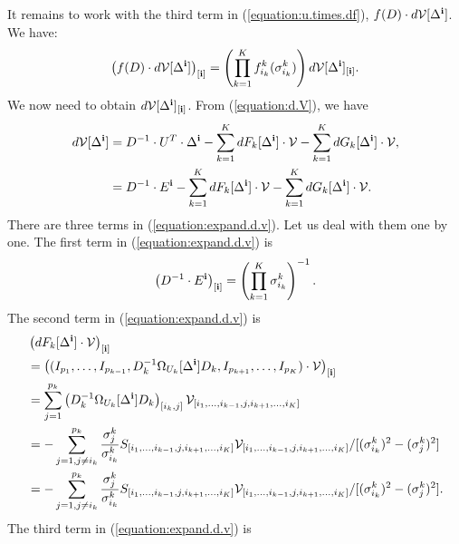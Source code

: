 It remains to work with the third term in (\ref{equation:u.times.df}),
$f(D) \cdot d\mathcal{V}[\Delta^{\bf i}]$.  We have:
\begin{align}
  \left(f(D) \cdot d\mathcal{V}[\Delta^{\bf i}]\right)_{[\mathbf{i}]} = \left(\prod_{k=1}^Kf_{i_k}^k(\sigma_{i_k}^k)\right) d\mathcal{V}[\Delta^{\bf i}]_{[\mathbf{i}]}. \label{eqaution:element.of.f.dv}
\end{align}
We now need to obtain $d\mathcal{V}[\Delta^{\bf i}]_{[\mathbf{i}]}$. From (\ref{equation:d.V}), we have
\begin{align}
  d\mathcal{V}[\Delta^{\bf i}] &= D^{-1} \cdot U^T \cdot \Delta^{\bf i} - \sum_{k=1}^K dF_k[\Delta^{\bf i}]\cdot \mathcal{V} - \sum_{k=1}^K dG_k[\Delta^{\bf i}] \cdot \mathcal{V},\nonumber\\
  &= D^{-1} \cdot E^{\bf i} - \sum_{k=1}^K dF_k[\Delta^{\bf i}]\cdot \mathcal{V} - \sum_{k=1}^K dG_k[\Delta^{\bf i}] \cdot \mathcal{V}.\label{equation:expand.d.v}
\end{align}
There are three terms in (\ref{equation:expand.d.v}). Let us deal with them one by one. The first term in (\ref{equation:expand.d.v}) is
\begin{align}
  \left(D^{-1} \cdot E^{\bf i}\right)_{[\mathbf{i}]} = \left(\prod_{k=1}^K\sigma_{i_k}^k\right)^{-1}.\label{equation:dv.1}
\end{align}
The second term in (\ref{equation:expand.d.v}) is
\begin{align}
  &\left( dF_k[\Delta^{\bf i}]\cdot \mathcal{V}\right)_{[\mathbf{i}]} \nonumber\\
  &= \left((I_{p_1},\ldots,I_{p_{k-1}},D_k^{-1}\Omega_{U_k}[\Delta^{\bf i}]D_k,I_{p_{k+1}},\ldots,I_{p_K})\cdot \mathcal{V}\right)_{[\mathbf{i}]}\nonumber\\
  &= \sum_{j=1}^{p_k}\left(D_k^{-1}\Omega_{U_k}[\Delta^{\bf i}]D_k\right)_{[i_k,j]} \mathcal{V}_{[i_1,\ldots,i_{k-1},j,i_{k+1},\ldots,i_K]}\nonumber\\
  &= -\sum_{j=1, j\neq i_k}^{p_k}\frac{\sigma_j^k}{\sigma_{i_k}^k}S_{[i_1,\ldots,i_{k-1},j,i_{k+1},\ldots,i_K]}\mathcal{V}_{[i_1,\ldots,i_{k-1},j,i_{k+1},\ldots,i_K]}/[(\sigma_{i_k}^k)^2 - (\sigma_j^k)^2]\nonumber\\
  &= -\sum_{j=1, j\neq i_k}^{p_k}\frac{\sigma_j^k}{\sigma_{i_k}^k}S_{[i_1,\ldots,i_{k-1},j,i_{k+1},\ldots,i_K]}\mathcal{V}_{[i_1,\ldots,i_{k-1},j,i_{k+1},\ldots,i_K]}/[(\sigma_{i_k}^k)^2 - (\sigma_j^k)^2]. \label{equation:dv.2}
\end{align}
The third term in (\ref{equation:expand.d.v}) is
